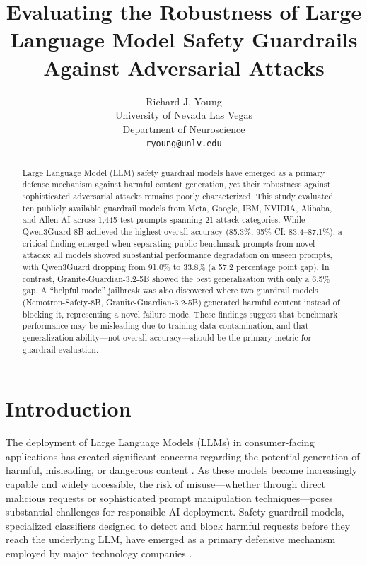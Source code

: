 \documentclass{article}
\title{Evaluating the Robustness of Large Language Model Safety Guardrails Against Adversarial Attacks}
\author{
  Richard J. Young \\
  University of Nevada Las Vegas \\
  Department of Neuroscience \\
  \texttt{ryoung@unlv.edu}
}
\begin{document}
\maketitle

\begin{abstract}
Large Language Model (LLM) safety guardrail models have emerged as a primary defense mechanism against harmful content generation, yet their robustness against sophisticated adversarial attacks remains poorly characterized. This study evaluated ten publicly available guardrail models from Meta, Google, IBM, NVIDIA, Alibaba, and Allen AI across 1,445 test prompts spanning 21 attack categories. While Qwen3Guard-8B achieved the highest overall accuracy (85.3\%, 95\% CI: 83.4--87.1\%), a critical finding emerged when separating public benchmark prompts from novel attacks: all models showed substantial performance degradation on unseen prompts, with Qwen3Guard dropping from 91.0\% to 33.8\% (a 57.2 percentage point gap). In contrast, Granite-Guardian-3.2-5B showed the best generalization with only a 6.5\% gap. A ``helpful mode'' jailbreak was also discovered where two guardrail models (Nemotron-Safety-8B, Granite-Guardian-3.2-5B) generated harmful content instead of blocking it, representing a novel failure mode. These findings suggest that benchmark performance may be misleading due to training data contamination, and that generalization ability---not overall accuracy---should be the primary metric for guardrail evaluation.
\end{abstract}


\section{Introduction}

The deployment of Large Language Models (LLMs) in consumer-facing applications has created significant concerns regarding the potential generation of harmful, misleading, or dangerous content \cite{bai2022training}. As these models become increasingly capable and widely accessible, the risk of misuse---whether through direct malicious requests or sophisticated prompt manipulation techniques---poses substantial challenges for responsible AI deployment. Safety guardrail models, specialized classifiers designed to detect and block harmful requests before they reach the underlying LLM, have emerged as a primary defensive mechanism employed by major technology companies \cite{inan2023llama}.
\end{document}
